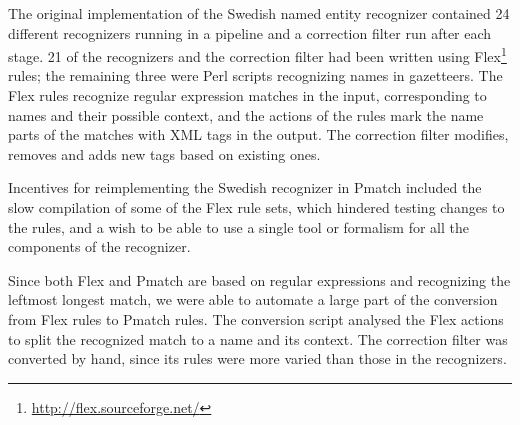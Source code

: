 \documentclass{llncs}
\begin{document}
The original implementation of the Swedish named entity recognizer
\cite{kokkinakis/2003} contained 24 different recognizers running in a
pipeline and a correction filter run after each stage. 21 of the
recognizers and the correction filter had been written using
Flex\footnote{\url{http://flex.sourceforge.net/}} rules; the remaining three
were Perl scripts recognizing names in gazetteers. The Flex rules
recognize regular expression matches in the input, corresponding to names
and their possible context, and the actions of the rules mark the name
parts of the matches with XML tags in the output. The correction
filter modifies, removes and adds new tags based on existing ones.


Incentives for reimplementing the Swedish recognizer in Pmatch
included the slow compilation of some of the Flex rule sets, which
hindered testing changes to the rules, and a
wish to be able to use a single tool or
formalism for all the components of the recognizer.

Since both Flex and Pmatch are based on regular expressions and
recognizing the leftmost longest match, we were able to automate a
large part of the conversion from Flex rules to Pmatch rules. The
conversion script analysed the Flex actions to split the recognized
match to a name and its context. The correction filter was converted
by hand, since its rules were more varied than those in the
recognizers.

\end{document}
